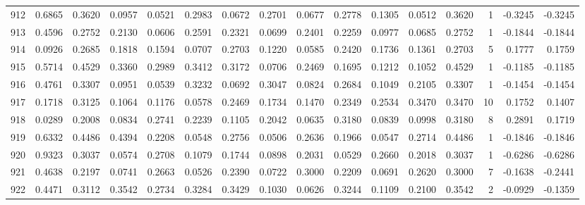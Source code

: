 \begin{tabular}{lrrrrrrrrrrrrrrr}
912 &      0.6865 &  0.3620 &  0.0957 &  0.0521 &  0.2983 &  0.0672 &  0.2701 &  0.0677 &  0.2778 &  0.1305 &   0.0512 &     0.3620 &      1 &                   -0.3245 &                    -0.3245 \\
913 &      0.4596 &  0.2752 &  0.2130 &  0.0606 &  0.2591 &  0.2321 &  0.0699 &  0.2401 &  0.2259 &  0.0977 &   0.0685 &     0.2752 &      1 &                   -0.1844 &                    -0.1844 \\
914 &      0.0926 &  0.2685 &  0.1818 &  0.1594 &  0.0707 &  0.2703 &  0.1220 &  0.0585 &  0.2420 &  0.1736 &   0.1361 &     0.2703 &      5 &                    0.1777 &                     0.1759 \\
915 &      0.5714 &  0.4529 &  0.3360 &  0.2989 &  0.3412 &  0.3172 &  0.0706 &  0.2469 &  0.1695 &  0.1212 &   0.1052 &     0.4529 &      1 &                   -0.1185 &                    -0.1185 \\
916 &      0.4761 &  0.3307 &  0.0951 &  0.0539 &  0.3232 &  0.0692 &  0.3047 &  0.0824 &  0.2684 &  0.1049 &   0.2105 &     0.3307 &      1 &                   -0.1454 &                    -0.1454 \\
917 &      0.1718 &  0.3125 &  0.1064 &  0.1176 &  0.0578 &  0.2469 &  0.1734 &  0.1470 &  0.2349 &  0.2534 &   0.3470 &     0.3470 &     10 &                    0.1752 &                     0.1407 \\
918 &      0.0289 &  0.2008 &  0.0834 &  0.2741 &  0.2239 &  0.1105 &  0.2042 &  0.0635 &  0.3180 &  0.0839 &   0.0998 &     0.3180 &      8 &                    0.2891 &                     0.1719 \\
919 &      0.6332 &  0.4486 &  0.4394 &  0.2208 &  0.0548 &  0.2756 &  0.0506 &  0.2636 &  0.1966 &  0.0547 &   0.2714 &     0.4486 &      1 &                   -0.1846 &                    -0.1846 \\
920 &      0.9323 &  0.3037 &  0.0574 &  0.2708 &  0.1079 &  0.1744 &  0.0898 &  0.2031 &  0.0529 &  0.2660 &   0.2018 &     0.3037 &      1 &                   -0.6286 &                    -0.6286 \\
921 &      0.4638 &  0.2197 &  0.0741 &  0.2663 &  0.0526 &  0.2390 &  0.0722 &  0.3000 &  0.2209 &  0.0691 &   0.2620 &     0.3000 &      7 &                   -0.1638 &                    -0.2441 \\
922 &      0.4471 &  0.3112 &  0.3542 &  0.2734 &  0.3284 &  0.3429 &  0.1030 &  0.0626 &  0.3244 &  0.1109 &   0.2100 &     0.3542 &      2 &                   -0.0929 &                    -0.1359 \\

\end{tabular}
